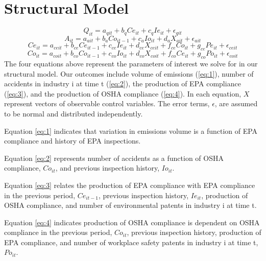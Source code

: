 \documentclass[12pt]{article}
\begin{document}
\section{Structural Model} \label{smodel}
\begin{equation} \label{eq:1} %
    Q_{it} = a_{qit} + b_qCe_{it} +c_qIe_{it}+ \epsilon_{qit}
\end{equation}
\begin{equation}\label{eq:2} %
    A_{it} = a_{ait}+ b_aCo_{it-1}+c_aIo_{it}+d_aX_{ait}+\epsilon_{ait}
\end{equation}
\begin{equation}\label{eq:3} %
    Ce_{it} = a_{ceit} + b_{ce}Ce_{it-1}+c_{ce}Ie_{it}+d_{ce}X_{ceit}+ f_{ce}Co_{it}+g_{ce}Pe_{it}+ \epsilon_{ceit}
\end{equation}
\begin{equation}\label{eq:4} %
    Co_{it} = a_{coit} + b_{co}Co_{it-1}+c_{co}Io_{it}+d_{co}X_{coit}+ f_{co}Ce_{it}+g_{co}Po_{it}+ \epsilon_{coit}
\end{equation}
The four equations above represent the parameters of interest we solve for in our structural model. Our outcomes include volume of emissions (\ref{eq:1}), number of accidents in industry i at time t (\ref{eq:2}), the production of EPA compliance (\ref{eq:3}), and the production of OSHA compliance (\ref{eq:4}). In each equation, $X$represent vectors of observable control variables. %
The error terms, $\epsilon$, are assumed to be normal and distributed independently. 
\par
Equation \ref{eq:1} indicates that variation in emissions volume is a function of EPA compliance and history of EPA inspections. %
\par
Equation \ref{eq:2} represents number of accidents as a function of OSHA compliance, $Co_{it}$, and previous inspection history, $Io_{it}$.
\par
Equation \ref{eq:3} relates the production of EPA compliance with EPA compliance in the previous period, $Ce_{it-1}$, previous inspection history, $Ie_{it}$, production of OSHA compliance, and number of environmental patents in industry i at time t. 
\par
Equation \ref{eq:4} indicates production of OSHA compliance is dependent on OSHA compliance in the previous period, $Co_{it}$, previous inspection history, production of EPA compliance, and number of workplace safety patents in industry i at time t, $Po_{it}$. %
\end{document}
